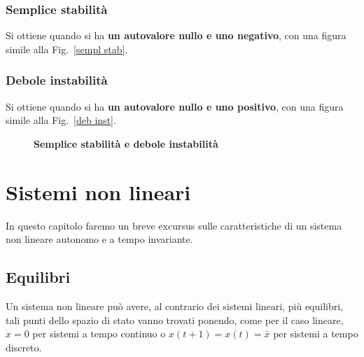 \documentclass[a4paper]{article}
\begin{document}
	\subsubsection{Semplice stabilità}
	Si ottiene quando si ha \textbf{un autovalore nullo e uno negativo}, con una figura simile alla Fig.~\ref{sempl stab}.
	
	
	\subsubsection{Debole instabilità}
	Si ottiene quando si ha \textbf{un autovalore nullo e uno positivo}, con una figura simile alla Fig.~\ref{deb inst}.
	\begin{figure}[H]
		\centering
		\qquad %
		\caption{\textbf{Semplice stabilità e debole instabilità}}
	\end{figure}

	
	\section{Sistemi non lineari}
	In questo capitolo faremo un breve excursus sulle caratteristiche di un sistema non lineare autonomo e a tempo invariante. 

	\subsection{Equilibri}
	Un sistema non lineare può avere, al contrario dei sistemi lineari, più equilibri, tali punti dello spazio di stato vanno trovati ponendo, come per il caso lineare, $\dot{x}=0$ per sistemi a tempo continuo o $x(t+1)=x(t)=\bar{x}$ per sistemi a tempo discreto. 
	
\end{document}
